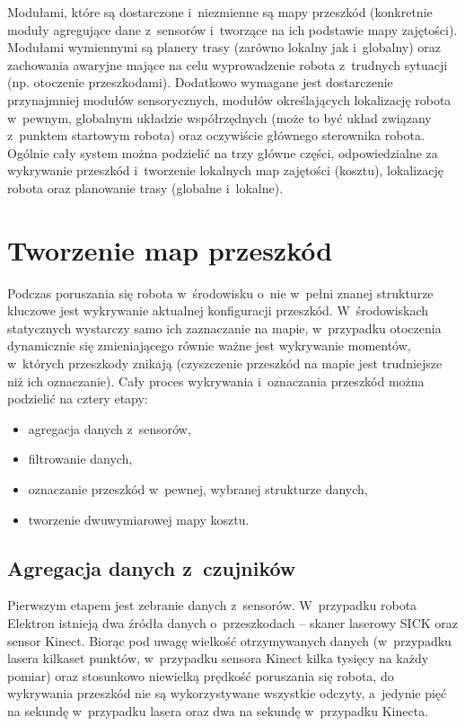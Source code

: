 Modułami, które są dostarczone i~niezmienne są mapy przeszkód (konkretnie
moduły agregujące dane z~sensorów i~tworzące na ich podstawie mapy zajętości).
Modułami wymiennymi są planery trasy (zarówno lokalny jak i~globalny) oraz
zachowania awaryjne mające na celu wyprowadzenie robota z~trudnych sytuacji
(np. otoczenie przeszkodami). Dodatkowo wymagane jest dostarczenie przynajmniej
modułów sensorycznych, modułów określających lokalizację robota w~pewnym,
globalnym układzie współrzędnych (może to być układ związany z~punktem startowym
robota) oraz oczywiście głównego sterownika robota. Ogólnie cały system można
podzielić na trzy główne części, odpowiedzialne za wykrywanie przeszkód
i~tworzenie lokalnych map zajętości (kosztu), lokalizację robota oraz planowanie
trasy (globalne i~lokalne).

\section{Tworzenie map przeszkód}

Podczas poruszania się robota w~środowisku o~nie w~pełni znanej strukturze
kluczowe jest wykrywanie aktualnej konfiguracji przeszkód. W~środowiskach
statycznych wystarczy samo ich zaznaczanie na mapie, w~przypadku otoczenia
dynamicznie się zmieniającego równie ważne jest wykrywanie momentów, w~których
przeszkody znikają (czyszczenie przeszkód na mapie jest trudniejsze niż ich
oznaczanie). Cały proces wykrywania i~oznaczania przeszkód można podzielić na
cztery etapy:

\begin{itemize}
  \item agregacja danych z~sensorów,
  \item filtrowanie danych,
  \item oznaczanie przeszkód w~pewnej, wybranej strukturze danych,
  \item tworzenie dwuwymiarowej mapy kosztu.
\end{itemize}

\subsection{Agregacja danych z~czujników}

Pierwszym etapem jest zebranie danych z~sensorów. W~przypadku robota Elektron
istnieją dwa źródła danych o~przeszkodach -- skaner laserowy SICK oraz sensor
Kinect. Biorąc pod uwagę wielkość otrzymywanych danych (w~przypadku lasera
kilkaset punktów, w~przypadku sensora Kinect kilka tysięcy na każdy pomiar) oraz
stosunkowo niewielką prędkość poruszania się robota, do wykrywania przeszkód
nie są wykorzystywane wszystkie odczyty, a~jedynie pięć na sekundę w~przypadku
lasera oraz dwa na sekundę w~przypadku Kinecta.

